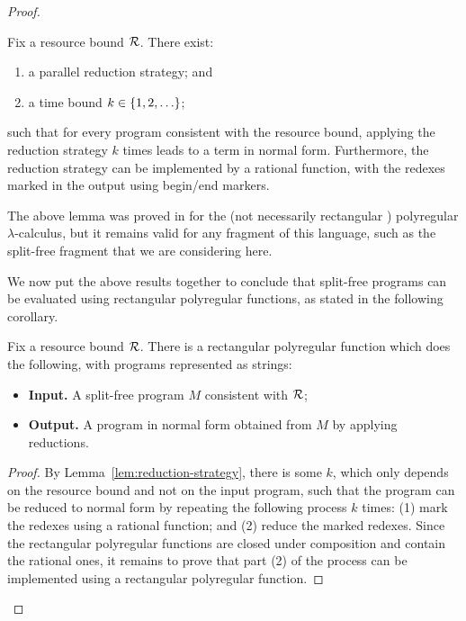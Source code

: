 \begin{proof}
    \begin{lemma} \label{lem:reduction-strategy} Fix a resource bound ${\mathcal R}$. There exist: 
        \begin{enumerate}
            \item a parallel reduction strategy; and 
            \item a time bound $k \in \{1,2,\ldots\}$;
       \end{enumerate}
       such that for every program consistent with the  resource bound, applying the reduction strategy $k$ times  leads to a term in normal form. Furthermore, the reduction strategy can be implemented by a rational function, with the redexes marked in the output using begin/end markers.
    \end{lemma}

    The above lemma was proved in \cite{bojanczykPolyregularFunctions2018} for the (not necessarily rectangular ) polyregular $\lambda$-calculus, but it remains valid for any fragment of this language, such as the split-free fragment that we are considering here. 

    We now put the above results together to conclude that split-free programs can be evaluated using rectangular polyregular functions, as stated in the following corollary.

    \begin{corollary}\label{cor:normalisation}
        Fix a resource bound ${\mathcal R}$. There is a rectangular polyregular function which does the following, with programs represented as strings:
        \begin{itemize}
            \item \textbf{Input.} A split-free program $M$ consistent with  ${\mathcal R}$;
            \item \textbf{Output.} A program in normal form obtained from $M$ by applying reductions.
        \end{itemize}
    \end{corollary}
    \begin{proof}
        By Lemma~\ref{lem:reduction-strategy}, there is some $k$, which only depends on the resource bound and not on the input program, such that the program can be reduced to normal form by repeating the following process $k$ times: (1) mark the redexes using a rational function; and (2) reduce the marked redexes. Since the rectangular polyregular functions are closed under composition and contain the rational ones, it remains to prove that part (2) of the process can be implemented using a rectangular polyregular function.
        

\end{proof}
\end{proof}
